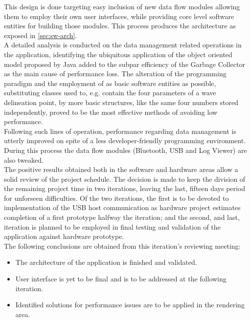 			This design is done targeting easy inclusion of new data flow modules allowing them to employ their own user interfaces, while providing core level software entities for building those modules. This process produces the architecture as exposed in \autoref{sec:sw-arch}.\\

			A detailed analysis is conducted on the data management related operations in the application, identifying the ubiquitous application of the object oriented model proposed by Java added to the subpar efficiency of the Garbage Collector  as the main cause of performance loss. The alteration of the programming paradigm and the employment of as basic software entities as possible, substituting classes used to, e.g. contain the four parameters of a wave delineation point, by more basic structures, like the same four numbers stored independently, proved to be the most effective methods of avoiding low performance.\\

			Following such lines of operation, performance regarding data management is utterly improved on spite of a less developer-friendly programming environment. During this process the data flow modules (Bluetooth, USB and Log Viewer) are also tweaked.\\

			The positive results obtained both in the software and hardware areas allow a solid review of the project schedule. The decision is made to keep the division of the remaining project time in two iterations, leaving the last, fifteen days period for unforseen difficulties. Of the two iterations, the first is to be devoted to implementation of the USB host communication as hardware project estimates completion of a first prototype halfway the iteration; and the second, and last, iteration is planned to be employed in final testing and validation of the application against hardware prototype.\\

			The following conclusions are obtained from this iteration's reviewing meeting:
			\begin{itemize}
				\item The architecture of the application is finished and validated.
				\item User interface is yet to be final and is to be addressed at the following iteration.
				\item Identified solutions for performance issues are to be applied in the rendering area.
			\end{itemize}

